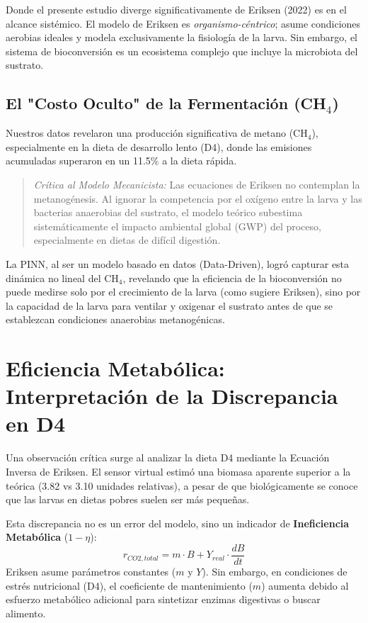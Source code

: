 Donde el presente estudio diverge significativamente de Eriksen (2022) es en el alcance sistémico. El modelo de Eriksen es \textit{organismo-céntrico}; asume condiciones aerobias ideales y modela exclusivamente la fisiología de la larva. Sin embargo, el sistema de bioconversión es un ecosistema complejo que incluye la microbiota del sustrato.

\subsection{El "Costo Oculto" de la Fermentación (CH$_4$)}
Nuestros datos revelaron una producción significativa de metano (CH$_4$), especialmente en la dieta de desarrollo lento (D4), donde las emisiones acumuladas superaron en un 11.5\% a la dieta rápida.
\begin{quote}
    \textit{Crítica al Modelo Mecanicista:} Las ecuaciones de Eriksen no contemplan la metanogénesis. Al ignorar la competencia por el oxígeno entre la larva y las bacterias anaerobias del sustrato, el modelo teórico subestima sistemáticamente el impacto ambiental global (GWP) del proceso, especialmente en dietas de difícil digestión.
\end{quote}

La PINN, al ser un modelo basado en datos (Data-Driven), logró capturar esta dinámica no lineal del CH$_4$, revelando que la eficiencia de la bioconversión no puede medirse solo por el crecimiento de la larva (como sugiere Eriksen), sino por la capacidad de la larva para ventilar y oxigenar el sustrato antes de que se establezcan condiciones anaerobias metanogénicas.

\section{Eficiencia Metabólica: Interpretación de la Discrepancia en D4}

Una observación crítica surge al analizar la dieta D4 mediante la Ecuación Inversa de Eriksen. El sensor virtual estimó una biomasa aparente superior a la teórica (3.82 vs 3.10 unidades relativas), a pesar de que biológicamente se conoce que las larvas en dietas pobres suelen ser más pequeñas.

Esta discrepancia no es un error del modelo, sino un indicador de \textbf{Ineficiencia Metabólica} ($1 - \eta$):
\begin{equation}
    r_{CO2, total} = m \cdot B + Y_{real} \cdot \frac{dB}{dt}
\end{equation}
Eriksen asume parámetros constantes ($m$ y $Y$). Sin embargo, en condiciones de estrés nutricional (D4), el coeficiente de mantenimiento ($m$) aumenta debido al esfuerzo metabólico adicional para sintetizar enzimas digestivas o buscar alimento.

